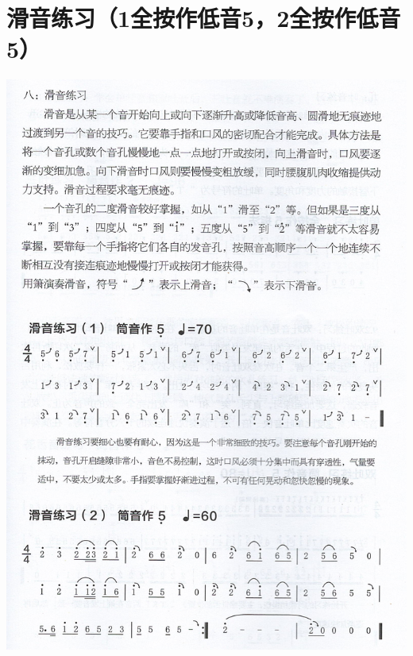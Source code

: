 \documentclass[cn,pad,chinese,chinesefont=nofont]{elegantbook}
\begin{document}
\section{滑音练习（1全按作低音5，2全按作低音5）}
\includegraphics[height=\textheight]{dongxiao/Scan 14.jpeg}
\end{document}
